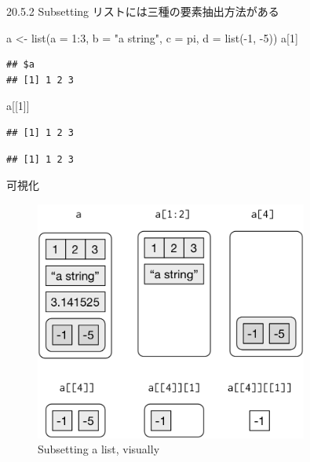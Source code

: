 \documentclass[
  ignorenonframetext,
]{beamer}
\newenvironment{Shaded}{\begin{snugshade}}{\end{snugshade}}
\newcommand{\AttributeTok}[1]{\textcolor[rgb]{0.77,0.63,0.00}{#1}}
\newcommand{\DecValTok}[1]{\textcolor[rgb]{0.00,0.00,0.81}{#1}}
\newcommand{\FunctionTok}[1]{\textcolor[rgb]{0.00,0.00,0.00}{#1}}
\newcommand{\NormalTok}[1]{#1}
\newcommand{\OtherTok}[1]{\textcolor[rgb]{0.56,0.35,0.01}{#1}}
\newcommand{\SpecialCharTok}[1]{\textcolor[rgb]{0.00,0.00,0.00}{#1}}
\newcommand{\StringTok}[1]{\textcolor[rgb]{0.31,0.60,0.02}{#1}}
\begin{document}
\begin{frame}[fragile]{20.5.2 Subsetting}
\protect\hypertarget{subsetting-1}{}
リストには三種の要素抽出方法がある

\begin{Shaded}
\begin{Highlighting}[]
\NormalTok{a }\OtherTok{\textless{}{-}} \FunctionTok{list}\NormalTok{(}\AttributeTok{a =} \DecValTok{1}\SpecialCharTok{:}\DecValTok{3}\NormalTok{, }\AttributeTok{b =} \StringTok{"a string"}\NormalTok{, }\AttributeTok{c =}\NormalTok{ pi, }\AttributeTok{d =} \FunctionTok{list}\NormalTok{(}\SpecialCharTok{{-}}\DecValTok{1}\NormalTok{, }\SpecialCharTok{{-}}\DecValTok{5}\NormalTok{))}
\NormalTok{a[}\DecValTok{1}\NormalTok{]}
\end{Highlighting}
\end{Shaded}

\begin{verbatim}
## $a
## [1] 1 2 3
\end{verbatim}

\begin{Shaded}
\begin{Highlighting}[]
\NormalTok{a[[}\DecValTok{1}\NormalTok{]]}
\end{Highlighting}
\end{Shaded}

\begin{verbatim}
## [1] 1 2 3
\end{verbatim}

\begin{Shaded}
\end{Shaded}

\begin{verbatim}
## [1] 1 2 3
\end{verbatim}
\end{frame}

\begin{frame}{可視化}
\protect\hypertarget{ux53efux8996ux5316}{}
\begin{figure}
\centering
\includegraphics[width=0.8\textwidth,height=\textheight]{../img/lists-subsetting.png}
\caption{Subsetting a list, visually}
\end{figure}
\end{frame}
\end{document}
